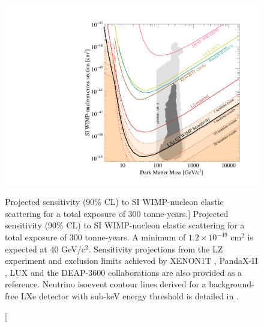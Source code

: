 \begin{figure}[h!]
    \centerline{\includegraphics[width=\linewidth]{Chapter_6/Figures/g3dm_si_vs_mass.pdf}}
    \caption
    [Projected sensitivity (90\% CL) to SI WIMP-nucleon elastic scattering for a total exposure of 300 tonne-years.]
    {Projected sensitivity (90\% CL) to SI WIMP-nucleon elastic scattering for a total exposure of 300 tonne-years. A minimum of $1.2 \times 10^{-49}$ cm$^{2}$ is expected at 40 GeV/c$^{2}$. Sensitivity projections from the LZ experiment \cite{akerib2018projected} and exclusion limits achieved by XENON1T \cite{xenon_1t}, PandaX-II \cite{pandax_limit}, LUX \cite{Akerib:2017kat} and the DEAP-3600 \cite{DEAP_3600} collaborations are also provided as a reference. Neutrino isoevent contour lines derived for a background-free LXe detector with sub-keV energy threshold is detailed in \cite{neutrino_floor, Billard:2013qya}.}
    \label{Fig:si_wimp_sensitivity}
\end{figure}

\newpage